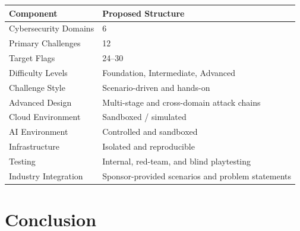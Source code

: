 \documentclass[11pt,a4paper]{article}
\begin{document}
\begin{center}

\begin{tabular}{ll}

\toprule

\textbf{Component} & \textbf{Proposed Structure} \\

\midrule

Cybersecurity Domains &
6 \\

Primary Challenges &
12 \\

Target Flags &
24--30 \\

Difficulty Levels &
Foundation, Intermediate, Advanced \\

Challenge Style &
Scenario-driven and hands-on \\

Advanced Design &
Multi-stage and cross-domain attack chains \\

Cloud Environment &
Sandboxed / simulated \\

AI Environment &
Controlled and sandboxed \\

Infrastructure &
Isolated and reproducible \\

Testing &
Internal, red-team, and blind playtesting \\

Industry Integration &
Sponsor-provided scenarios and problem statements \\

\bottomrule

\end{tabular}

\end{center}



\newpage

\section*{Conclusion}

\end{document}
